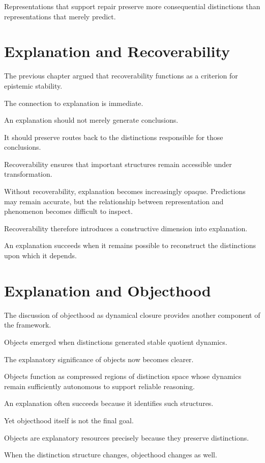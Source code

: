 \documentclass[11pt,oneside,openany]{book}
\begin{document}
Representations that support repair preserve more consequential distinctions than representations that merely predict.

\section{Explanation and Recoverability}

The previous chapter argued that recoverability functions as a criterion for epistemic stability.

The connection to explanation is immediate.

An explanation should not merely generate conclusions.

It should preserve routes back to the distinctions responsible for those conclusions.

Recoverability ensures that important structures remain accessible under transformation.

Without recoverability, explanation becomes increasingly opaque. Predictions may remain accurate, but the relationship between representation and phenomenon becomes difficult to inspect.

Recoverability therefore introduces a constructive dimension into explanation.

An explanation succeeds when it remains possible to reconstruct the distinctions upon which it depends.

\section{Explanation and Objecthood}

The discussion of objecthood as dynamical closure provides another component of the framework.

Objects emerged when distinctions generated stable quotient dynamics.

The explanatory significance of objects now becomes clearer.

Objects function as compressed regions of distinction space whose dynamics remain sufficiently autonomous to support reliable reasoning.

An explanation often succeeds because it identifies such structures.

Yet objecthood itself is not the final goal.

Objects are explanatory resources precisely because they preserve distinctions.

When the distinction structure changes, objecthood changes as well.
\end{document}
